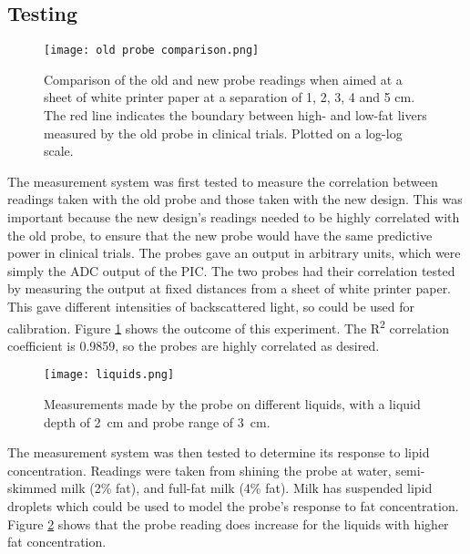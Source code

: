 \subsection{Testing}
\begin{figure}[htb]
	\centering
	\texttt{[image: old probe comparison.png]}
	\caption{Comparison of the old and new probe readings when aimed at a sheet of white printer paper at a separation of 1, 2, 3, 4 and 5 cm. The red line indicates the boundary between high- and low-fat livers measured by the old probe in clinical trials. Plotted on a log-log scale.}
	\label{fig: old probe comparison}
\end{figure}

The measurement system was first tested to measure the correlation between readings taken with the old probe and those taken with the new design. This was important because the new design's readings needed to be highly correlated with the old probe, to ensure that the new probe would have the same predictive power in clinical trials. The probes gave an output in arbitrary units, which were simply the ADC output of the PIC. The two probes had their correlation tested by measuring the output at fixed distances from a sheet of white printer paper. This gave different intensities of backscattered light, so could be used for calibration. Figure \ref{fig: old probe comparison} shows the outcome of this experiment. The R\textsuperscript{2} correlation coefficient is 0.9859, so the probes are highly correlated as desired. \\

\begin{figure}[h!]
	\centering
	\texttt{[image: liquids.png]}
	\caption{Measurements made by the probe on different liquids, with a liquid depth of \SI{2}{\centi\metre} and probe range of \SI{3}{\centi\metre}.}
	\label{fig: liquids}
\end{figure}

The measurement system was then tested to determine its response to lipid concentration. Readings were taken from shining the probe at water, semi-skimmed milk (2\% fat), and full-fat milk (4\% fat). Milk has suspended lipid droplets which could be used to model the probe's response to fat concentration. Figure \ref{fig: liquids} shows that the probe reading does increase for the liquids with higher fat concentration.
